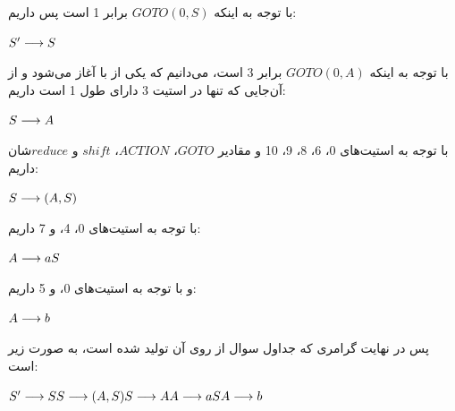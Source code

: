 \documentclass{article}
\begin{document}
با توجه به اینکه $GOTO(0, S)$ برابر 1 است پس داریم:
\begin{latin}
$\\
S^\prime \longrightarrow S
$
\end{latin}

با توجه به اینکه $GOTO(0, A)$ برابر 3 است، می‌دانیم که یکی از  با  آغاز می‌شود و از آن‌جایی که تنها  در استیت 3 دارای طول 1 است داریم:
\begin{latin}
$\\
S \longrightarrow A
$
\end{latin}

با توجه به استیت‌های 0، 6، 8، 9، 10 و مقادیر $GOTO$، $ACTION$، $shift$ و $reduce$شان داریم:
\begin{latin}
$\\
S \longrightarrow (A, S)
$
\end{latin}
با توجه به استیت‌های 0، 4، و 7 داریم:
\begin{latin}
$\\
A \longrightarrow a S
$
\end{latin}

و با توجه به استیت‌های 0، و 5 داریم:
\begin{latin}
$\\
A \longrightarrow b
$
\end{latin}

پس در نهایت گرامری كه جداول سوال از روی آن توليد شده است، به صورت زیر است:
\begin{latin}
$\\
S ^ \prime \longrightarrow S \\
S \longrightarrow (A, S) \\
S \longrightarrow A \\
A \longrightarrow a S \\
A \longrightarrow b
$
\end{latin}
\end{document}
